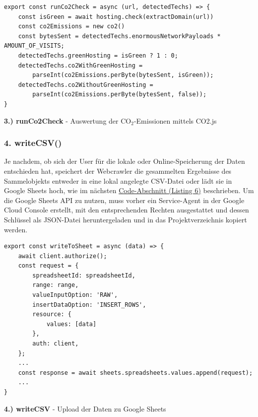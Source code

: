 \documentclass[Bachelor,BIF,german,IEEE]{BASE/twbook}
\begin{document}
\begin{listing}[htbp]
\begin{verbatim}
export const runCo2Check = async (url, detectedTechs) => {
    const isGreen = await hosting.check(extractDomain(url))
    const co2Emissions = new co2()
    const bytesSent = detectedTechs.enormousNetworkPayloads * AMOUNT_OF_VISITS;
    detectedTechs.greenHosting = isGreen ? 1 : 0;
    detectedTechs.co2WithGreenHosting = 
        parseInt(co2Emissions.perByte(bytesSent, isGreen));
    detectedTechs.co2WithoutGreenHosting = 
        parseInt(co2Emissions.perByte(bytesSent, false));
}
\end{verbatim}
\caption{\textbf{3.) runCo2Check} - Auswertung der CO$_2$-Emissionen mittels CO2.js}
\label{code:co2}
\end{listing}

\subsubsection{4. writeCSV()}
Je nachdem, ob sich der User für die lokale oder Online-Speicherung der Daten entschieden hat, speichert der Webcrawler die gesammelten Ergebnisse des Sammelobjekts entweder in eine lokal angelegte CSV-Datei oder lädt sie in Google Sheets hoch, wie im nächsten \hyperref[code:google]{Code-Abschnitt (Listing 6)} beschrieben. Um die Google Sheets API zu nutzen, muss vorher ein Service-Agent in der Google Cloud Console erstellt, mit den entsprechenden Rechten ausgestattet und dessen Schlüssel als JSON-Datei heruntergeladen und in das Projektverzeichnis kopiert werden.

\begin{listing}[htbp]
\begin{verbatim}
export const writeToSheet = async (data) => {
    await client.authorize();
    const request = {
        spreadsheetId: spreadsheetId,
        range: range,
        valueInputOption: 'RAW',
        insertDataOption: 'INSERT_ROWS',
        resource: {
            values: [data]
        },
        auth: client,
    };
    ...
    const response = await sheets.spreadsheets.values.append(request);
    ...
}
\end{verbatim}
\caption{\textbf{4.) writeCSV} - Upload der Daten zu Google Sheets }
\label{code:google}
\end{listing}
\end{document}
